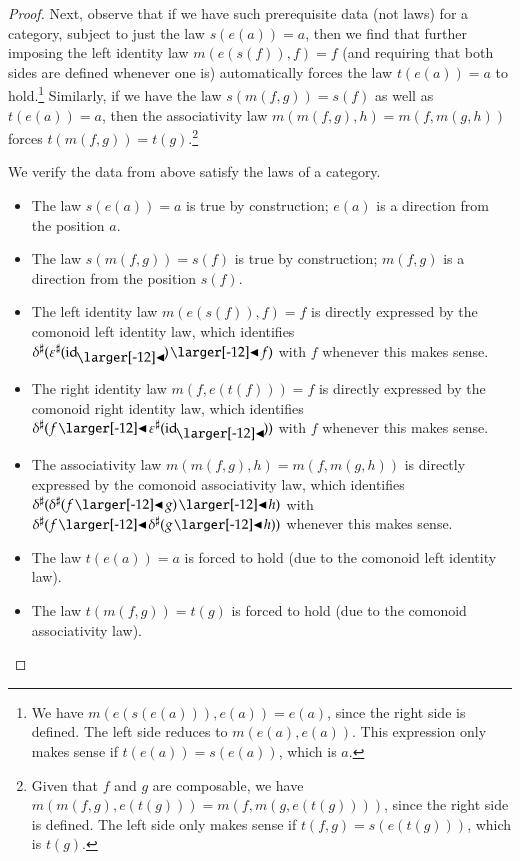 \documentclass{amsart}
\begin{document}
\begin{proof}
  Next, observe that if we have such prerequisite data (not laws) for
  a category, subject to just the law $s(e(a)) = a$, then we find that
  further imposing the left identity law $m(e(s(f)), f) = f$
  (and requiring that both sides are defined whenever one is)
  automatically forces the law $t(e(a)) = a$ to hold.\footnote{We have
    $m(e(s(e(a))), e(a)) = e(a)$, since the right side is defined. The
    left side reduces to $m(e(a), e(a))$. This expression only makes
    sense if $t(e(a)) = s(e(a))$, which is $a$.}  Similarly, if we
  have the law $s(m(f,g))=s(f)$ as well as $t(e(a)) = a$, then the
  associativity law $m(m(f,g),h) = m(f,m(g,h))$ forces
  $t(m(f,g)) = t(g)$.\footnote{Given that $f$ and $g$ are composable,
    we have $m(m(f,g),e(t(g))) = m(f,m(g,e(t(g))))$, since the right
    side is defined. The left side only makes sense if
    $t(f,g) = s(e(t(g)))$, which is $t(g)$.}

  We verify the data from above satisfy the laws of a category.
  \begin{itemize}
  \item The law $s(e(a)) = a$ is true by construction; $e(a)$ is a
    direction from the position $a$.
  \item The law $s(m(f, g)) = s(f)$ is true by construction; $m(f, g)$
    is a direction from the position $s(f)$.
  \item The left identity law $m(e(s(f)), f) = f$ is directly
    expressed by the comonoid left identity law, which identifies
    ${\anydirmap{\delta}{\anydirmap{\varepsilon}{\idsubd} \subd f}}$
    with $f$ whenever this makes sense.\iffalse\footnote{Meaning,
        there are $u$ and $v$ such that
        ${\dirmap{\delta}{u}{\dirmap{\varepsilon}{v}{\idsubd} \subd
            f}}$ specifies a direction from position $a$ $\iff$ $f$
        specifies a direction from position $a$; in this case, the
        former and latter are equal.}\fi
  \item The right identity law $m(f, e(t(f))) = f$ is directly
    expressed by the comonoid right identity law, which identifies
    ${\anydirmap{\delta}{f \subd \anydirmap{\varepsilon}{\idsubd}}}$
    with $f$ whenever this makes sense.
  \item The associativity law $m(m(f, g), h) = m(f, m(g, h))$ is
    directly expressed by the comonoid associativity law, which
    identifies
    ${\anydirmap{\delta}{\anydirmap{\delta}{f \subd g} \subd h}}$ with
    ${\anydirmap{\delta}{f \subd \anydirmap{\delta}{g \subd h}}}$ whenever this makes sense.
  \item The law $t(e(a)) = a$ is forced to hold (due to the comonoid
    left identity law).
  \item The law $t(m(f, g)) = t(g)$ is forced to hold (due to the
    comonoid associativity law).
  \end{itemize}


\end{proof}
\end{document}
